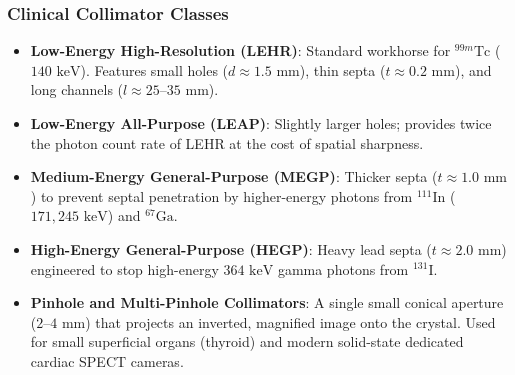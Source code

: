 \documentclass[11pt,a4paper]{article}
\begin{document}
\subsubsection{Clinical Collimator Classes}
\begin{itemize}[leftmargin=*]
    \item \textbf{Low-Energy High-Resolution (LEHR)}: Standard workhorse for $^{99m}\text{Tc}$ ($140\text{ keV}$). Features small holes ($d \approx 1.5\text{ mm}$), thin septa ($t \approx 0.2\text{ mm}$), and long channels ($l \approx 25\text{--}35\text{ mm}$).
    \item \textbf{Low-Energy All-Purpose (LEAP)}: Slightly larger holes; provides twice the photon count rate of LEHR at the cost of spatial sharpness.
    \item \textbf{Medium-Energy General-Purpose (MEGP)}: Thicker septa ($t \approx 1.0\text{ mm}$) to prevent septal penetration by higher-energy photons from $^{111}\text{In}$ ($171, 245\text{ keV}$) and $^{67}\text{Ga}$.
    \item \textbf{High-Energy General-Purpose (HEGP)}: Heavy lead septa ($t \approx 2.0\text{ mm}$) engineered to stop high-energy $364\text{ keV}$ gamma photons from $^{131}\text{I}$.
    \item \textbf{Pinhole and Multi-Pinhole Collimators}: A single small conical aperture ($2\text{--}4\text{ mm}$) that projects an inverted, magnified image onto the crystal. Used for small superficial organs (thyroid) and modern solid-state dedicated cardiac SPECT cameras.
\end{itemize}
\end{document}
